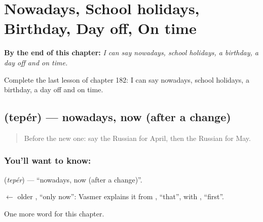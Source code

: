 
\chapter{Nowadays, School holidays, Birthday, Day off, On time}
\label{ch:ru-nowadays-school-holidays-birthday-day-off-on-time}

\begin{chapteropening}
\textbf{By the end of this chapter:} \emph{I can say nowadays, school holidays, a birthday, a day off and on time.}

Complete the last lesson of chapter 182: I can say nowadays, school holidays, a birthday, a day off and on time.
\end{chapteropening}

\section[\texorpdfstring{\ru{теперь} (tepér)}{теперь (tepér)}]{ (tepér) — nowadays, now (after a change)}

\label{lesson:RU-C182-teper}



\begin{quote}
Before the new one: say the Russian for April, then the Russian for May.
\end{quote}

\subsection*{You'll want to know: }
\textbf{} (\emph{tepér}) — \textquotedblleft{}nowadays, now (after a change)\textquotedblright{}.

\begin{cousinweb}
\textbf{} $\leftarrow$ older \emph{}, \textquotedblleft{}only now\textquotedblright{}: Vasmer explains it from \emph{}, \textquotedblleft{}that\textquotedblright{}, with \emph{}, \textquotedblleft{}first\textquotedblright{}.
\end{cousinweb}

\begin{grammarlens}[title={What you've built}]
One more word for this chapter.
\end{grammarlens}

